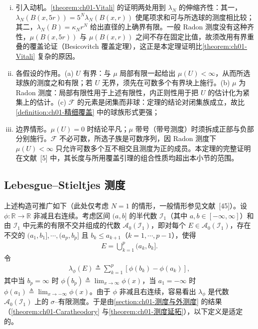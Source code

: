 \documentclass[../../main.tex]{subfiles}%
\begin{document}
\begin{remark}\label{remark:ch01-VitaliBesicovitch}
\begin{enumerate}[(i)]
\item 引入动机。\cref{theorem:ch01-Vitali} 的证明两处用到 $\lambda_N$ 的伸缩齐性：其一，$\lambda_N(B(x,5r))=5^N\lambda_N(B(x,r))$ 使尾项求和可与所选球的测度相比较；其二，$\lambda_N(B)=\kappa_Nr^N$ 给出直径的上确界有限。一般 Radon 测度没有这种齐性，$\mu(B(x,5r))$ 与 $\mu(B(x,r))$ 之间不存在固定比值，故须改用有界重叠的覆盖论证（Besicovitch 覆盖定理），这正是本定理证明比\cref{theorem:ch01-Vitali} 复杂的原因。
\item 各假设的作用。(a) $U$ 有界：与 $\mu$ 局部有限一起给出 $\mu(U)<\infty$，从而所选球族的测度之和有限；若 $U$ 无界，须先在可数多个有界块上施行。(b) $\mu$ 为 Radon 测度：局部有限性用于上述有限性，内正则性用于把 $U$ 的估计化为紧集上的估计。(c) $\mathcal{F}$ 的元素是闭集而非球：定理的结论对闭集族成立，故比\cref{definition:ch01-精细覆盖} 中的球族形式更强；
\item 边界情形。$\mu(U)=0$ 时结论平凡；$\mu$ 带号（带号测度）时须拆成正部与负部分别施行。$\mathcal{F}$ 不必可数，所选子族是可数序列，因 Radon 测度下 $\mu(U)<\infty$ 只允许可数多个互不相交且测度为正的成员。本定理的完整证明在文献~[5] 中，其长度与所用覆盖引理的组合性质均超出本小节的范围。
\end{enumerate}
\end{remark}


\subsection{Lebesgue--Stieltjes 测度}\label{subsection:ch01-Stieltjes}

上述构造可推广如下（此处仅考虑 $N=1$ 的情形，一般情形参见文献~[45]）。设 $\phi:\mathbb{R}\to\mathbb{R}$ 非减且右连续。考虑区间 $(a,b]$ 的半代数 $\mathcal{I}_1$（其中 $a,b\in[-\infty,\infty]$）和由 $\mathcal{I}_1$ 中元素的有限不交并组成的代数 $\mathcal{A}_0(\mathcal{I}_1)$，即对每个 $E\in\mathcal{A}_0(\mathcal{I}_1)$，存在不交的 $(a_1,b_1],\cdots ,(a_p,b_p]$ 且 $b_k\leqslant a_{k+1}$（$k=1,\cdots ,p-1$），使得
\begin{align*}
E=\bigcup_{k=1}^p(a_k,b_k].
\end{align*}
令
\begin{align}
\lambda_\phi(E)\triangleq \sum_{k=1}^p[\phi(b_k)-\phi(a_k)], \label{align:ch01-Stieltjes定义}
\end{align}
其中当 $b_p=\infty$ 时 $\phi(b_p)\triangleq\lim_{x\to\infty}\phi(x)$，当 $a_1=-\infty$ 时 $\phi(a_1)\triangleq\lim_{x\to-\infty}\phi(x)$。由于 $\phi$ 非减且右连续，容易看出 $\lambda_\phi$ 是代数 $\mathcal{A}_0(\mathcal{I}_1)$ 上的 $\sigma$--有限测度。于是由\cref{section:ch01-测度与外测度} 的结果（\cref{theorem:ch01-Caratheodory} 与\cref{theorem:ch01-测度延拓}），以下定义是适定的。
\end{document}
